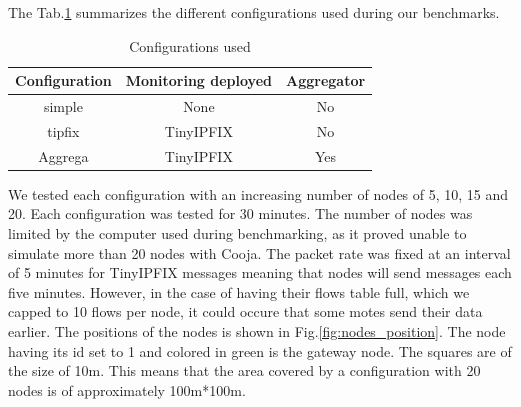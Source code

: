 The Tab.\ref{table:configurations} summarizes the different configurations used during our benchmarks. \\

\begin{table}
  \centering
  \begin{tabular}{|c|c|c|}
    \hline
    Configuration & Monitoring deployed & Aggregator \\
    \hline
    simple & None & No \\
    \hline
    tipfix & TinyIPFIX & No \\
    \hline
    Aggrega & TinyIPFIX & Yes \\
    \hline
  \end{tabular}
  \caption{Configurations used}
  \label{table:configurations}
\end{table}

We tested each configuration with an increasing number of nodes of 5, 10, 15 and 20. Each configuration was tested for 30 minutes. The number of nodes was limited by the computer used during benchmarking, as it proved unable to simulate more than 20 nodes with Cooja. The packet rate was fixed at an interval of 5 minutes for TinyIPFIX messages meaning that nodes will send messages each five minutes. However, in the case of having their flows table full, which we capped to 10 flows per node, it could occure that some motes send their data earlier. The positions of the nodes is shown in Fig.\ref{fig:nodes_position}. The node having its id set to 1 and colored in green is the gateway node. The squares are of the size of 10\acrshort{m}. This means that the area covered by a configuration with 20 nodes is of approximately 100m*100m.\\

